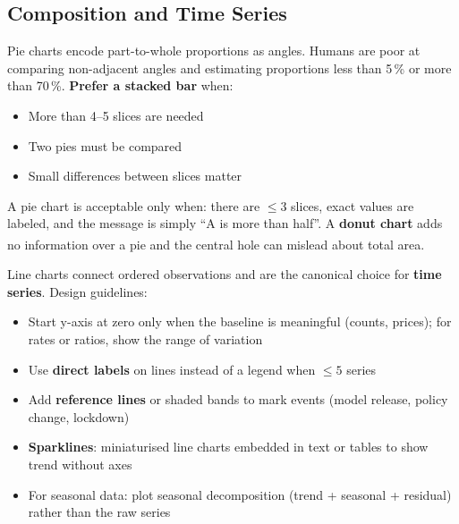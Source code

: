 \subsection{Composition and Time Series}

\begin{tcbitemize}[ skin=sectionraster ]
    \tcbitem[title={Pie Charts and When to Avoid Them}, raster multicolumn=3]
    Pie charts encode part-to-whole proportions as angles. Humans are poor at comparing
    non-adjacent angles and estimating proportions less than 5\,\% or more than 70\,\%.
    \textbf{Prefer a stacked bar} when:
    \begin{itemize}
        \item More than 4--5 slices are needed
        \item Two pies must be compared
        \item Small differences between slices matter
    \end{itemize}
    A pie chart is acceptable only when: there are $\leq3$ slices, exact values are
    labeled, and the message is simply ``A is more than half''.
    A \textbf{donut chart} adds no information over a pie and the central hole
    can mislead about total
    area\textsuperscript{\cite[][pp.~95--100]{brucePracticalStatisticsData2017}}.

    \tcbitem[title={Line Charts and Time Series}, raster multicolumn=3]
    Line charts connect ordered observations and are the canonical choice for
    \textbf{time series}. Design guidelines:
    \begin{itemize}
        \item Start y-axis at zero only when the baseline is meaningful (counts, prices);
              for rates or ratios, show the range of variation
        \item Use \textbf{direct labels} on lines instead of a legend when $\leq5$ series
        \item Add \textbf{reference lines} or shaded bands to mark events (model release,
              policy change, lockdown)
        \item \textbf{Sparklines}: miniaturised line charts embedded in text or tables to
              show trend without axes
        \item For seasonal data: plot seasonal decomposition (trend + seasonal + residual)
              rather than the raw series
    \end{itemize}
\end{tcbitemize}

